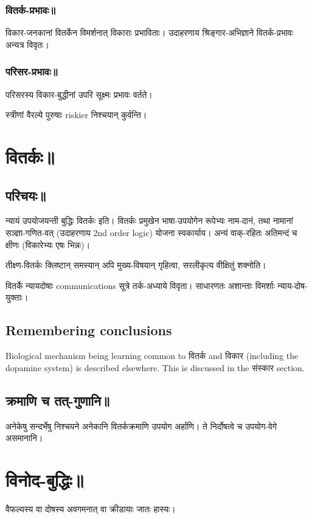 \documentclass[oneside, article]{memoir}
\begin{document}
\subsubsection{वितर्क-प्रभावः॥}
विकार-जनकानां वितर्केन विमर्शनात् विकाराः प्रभाविताः। उदाहरणाय श्रिङ्गार-अभिज्ञाने वितर्क-प्रभावः अन्यत्र विवृतः।

\subsubsection{परिसर-प्रभावः॥}
परिसरस्य विकार-बुद्धीनां उपरि सूक्ष्मः प्रभावः वर्तते।

स्त्रीणां‌ वैरल्ये पुरुषाः riskier निश्चयान् कुर्वन्ति।

\section{वितर्कः॥}
\subsection{परिचयः॥}
न्यायं उपयोजयन्ती बुद्धिः‌ वितर्कः इति। वितर्कः प्रमुखेन भाषा-उपयोगेन रूपेभ्यः नाम-दानं, तथा नामानां सञ्ज्ञा-गणित-वत् (उदाहरणाय 2nd order logic) योजना स्वकार्याय। अन्यं वाक्-रहितः अतिमन्दं च क्षीणः (विकारेभ्यः एषः भिन्नः)।

तीक्ष्ण-वितर्कः क्लिष्टान् समस्यान् अपि मुख्य-विषयान् गृहित्वा, सरलीकृत्य वीक्षितुं शक्नोति।

वितर्के न्यायदोषाः communications सूत्रे तर्क-अध्याये विवृता। साधारणतः अशान्ताः विमर्शाः न्याय-दोष-युक्ताः।

\subsection{Remembering conclusions}
Biological mechanism being learning common to वितर्क and विकार (including the dopamine system) is described elsewhere. This is discussed in the संस्कार section.

\subsection{क्रमाणि च तत्-गुणानि॥}
अनेकेषु सन्दर्भेषु निश्चयने अनेकानि वितर्कक्रमाणि उपयोग अर्हाणि। ते निर्दोषत्वे च उपयोग-वेगे असमानानि।

\section{विनोद-बुद्धिः॥}
वैफल्यस्य वा दोषस्य अवगमनात् वा क्रीडायाः जातः हास्यः।
\end{document}
